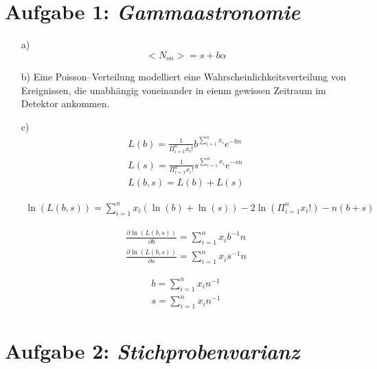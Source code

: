\section*{Aufgabe 1: \emph{Gammaastronomie}}

\begin{itemize}
\item[a)] 
\begin{equation*}
<N_{on}> = s + b \alpha
\end{equation*}
\item[b)] Eine Poisson--Verteilung modelliert eine Wahrscheinlichkeitsverteilung von Ereignissen, die unabhängig voneinander in eienm gewissen Zeitraum im Detektor ankommen.
\item[c)]
\begin{align*}
L(b)=\frac{1}{\Pi_{i=1}^n x_i!}b^{\sum_{i=1}^n x_i}e^{-bn}\\
L(s)=\frac{1}{\Pi_{i=1}^n x_i!}s^{\sum_{i=1}^n x_i}e^{-sn}\\
L(b,s)=L(b)+L(s)
\end{align*}

\begin{align*}
\ln(L(b,s))=\sum_{i=1}^n x_i \left(\ln(b)+\ln(s)\right)-2\ln\left(\Pi_{i=1}^n x_i!\right)-n(b+s)
\end{align*}

\begin{align*}
\frac{\partial \ln(L(b,s))}{\partial b}=\sum_{i=1}^n x_i b^{-1}n\\
\frac{\partial \ln(L(b,s))}{\partial s}=\sum_{i=1}^n x_i s^{-1}n
\end{align*}

\begin{align*}
b=\sum_{i=1}^n x_i n^{-1}\\
s=\sum_{i=1}^n x_i n^{-1}
\end{align*}

\end{itemize}



\section*{Aufgabe 2: \emph{Stichprobenvarianz}}

